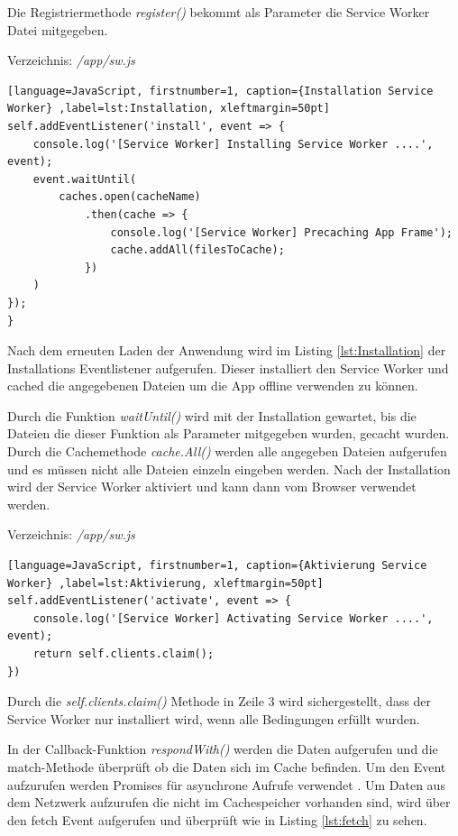\clearpage
Die Registriermethode \textit{register()} bekommt als Parameter die Service Worker Datei mitgegeben.

Verzeichnis: \textit{/app/sw.js}

\begin{lstlisting}[language=JavaScript, firstnumber=1, caption={Installation Service Worker} ,label=lst:Installation, xleftmargin=50pt]
self.addEventListener('install', event => {
    console.log('[Service Worker] Installing Service Worker ....', event);
    event.waitUntil(
        caches.open(cacheName)
            .then(cache => {
                console.log('[Service Worker] Precaching App Frame');
                cache.addAll(filesToCache);
            })
    )
});
}
\end{lstlisting}

Nach dem erneuten Laden der Anwendung wird im Listing \ref{lst:Installation} der Installations Eventlistener aufgerufen. Dieser installiert den Service Worker und cached die angegebenen Dateien um die App offline verwenden zu können. 

Durch die Funktion \textit{waitUntil()} wird mit der Installation gewartet, bis die Dateien die dieser Funktion als Parameter mitgegeben wurden, gecacht wurden. Durch die Cachemethode \textit{cache.All()} werden alle angegeben Dateien aufgerufen und es müssen nicht alle Dateien einzeln eingeben werden.
Nach der Installation wird der Service Worker aktiviert und kann dann vom Browser verwendet werden.

Verzeichnis: \textit{/app/sw.js}

\begin{lstlisting}[language=JavaScript, firstnumber=1, caption={Aktivierung Service Worker} ,label=lst:Aktivierung, xleftmargin=50pt]
self.addEventListener('activate', event => {
    console.log('[Service Worker] Activating Service Worker ....', event);
    return self.clients.claim();
})
\end{lstlisting}

Durch die \textit{self.clients.claim()} Methode in Zeile 3 wird sichergestellt, dass der Service Worker nur installiert wird, wenn alle Bedingungen erfüllt wurden.

In der Callback-Funktion \textit{respondWith()} werden die Daten aufgerufen und die \\match-Methode überprüft ob die Daten sich im Cache befinden.
Um den Event aufzurufen werden Promises für asynchrone Aufrufe verwendet .
Um Daten aus dem Netzwerk aufzurufen die nicht im Cachespeicher vorhanden sind, wird über den fetch Event aufgerufen und überprüft wie in Listing \ref{lst:fetch} zu sehen.

